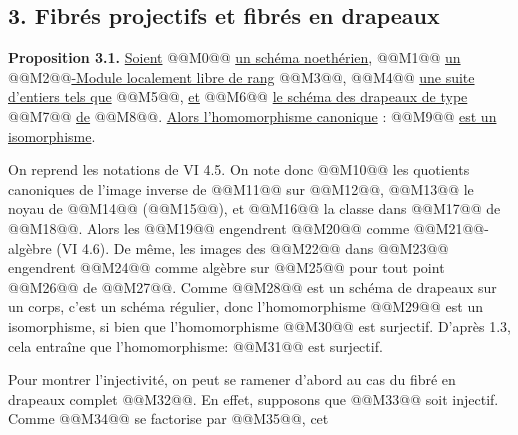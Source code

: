 
\subsection*{3. Fibrés projectifs et fibrés en drapeaux}

\textbf{Proposition 3.1.} \uline{Soient} @@M0@@ \uline{un schéma noethérien}, @@M1@@ \uline{un} @@M2@@\uline{-Module localement libre de rang} @@M3@@, @@M4@@ \uline{une suite d'entiers tels que} @@M5@@, \uline{et} @@M6@@ \uline{le schéma des drapeaux de type} @@M7@@ \uline{de} @@M8@@. \uline{Alors l'homomorphisme canonique} :
@@M9@@
\uline{est un isomorphisme}.

On reprend les notations de VI 4.5. On note donc @@M10@@ les quotients canoniques de l'image inverse de @@M11@@ sur @@M12@@, @@M13@@ le noyau de @@M14@@ (@@M15@@), et @@M16@@ la classe dans @@M17@@ de @@M18@@. Alors les @@M19@@ engendrent @@M20@@ comme @@M21@@-algèbre (VI 4.6). De même, les images des @@M22@@ dans @@M23@@ engendrent @@M24@@ comme algèbre sur @@M25@@ pour tout point @@M26@@ de @@M27@@. Comme @@M28@@ est un schéma de drapeaux sur un corps, c'est un schéma régulier, donc l'homomorphisme @@M29@@ est un isomorphisme, si bien que l'homomorphisme @@M30@@ est surjectif. D'après 1.3, cela entraîne que l'homomorphisme:
@@M31@@
est surjectif.

Pour montrer l'injectivité, on peut se ramener d'abord au cas du fibré en drapeaux complet @@M32@@. En effet, supposons que
@@M33@@
soit injectif. Comme @@M34@@ se factorise par @@M35@@, cet
